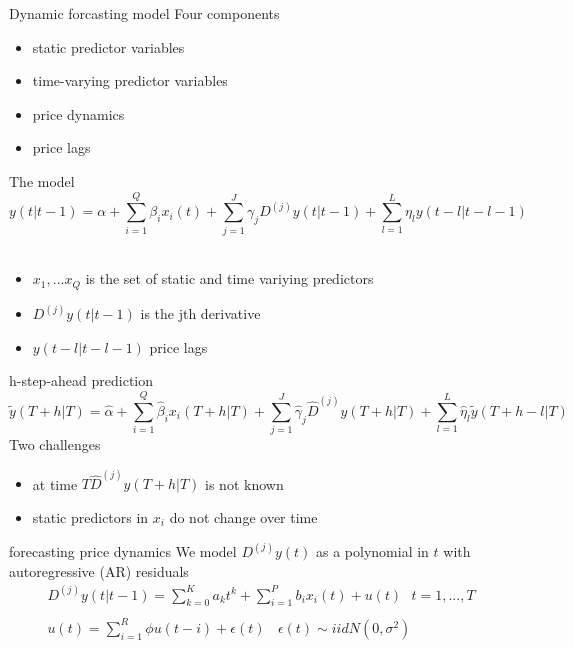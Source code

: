 \documentclass[hyperref={pdfpagelabels=false}]{beamer}
\begin{document}
\begin{frame}{Dynamic forcasting model}
Four components
\begin{itemize}
	\item static predictor variables
	\item time-varying predictor variables
	\item price dynamics
	\item price lags
\end{itemize}	
\end{frame}

\begin{frame}{The model}
\begin{equation}
y(t|t-1)=\alpha+\sum_{i=1}^{Q}\beta_ix_i(t)+\sum_{j=1}^J\gamma_jD^{(j)}y(t|t-1)+\sum_{l=1}^L\eta_ly(t-l|t-l-1) \nonumber
\end{equation}
\newline \\
\begin{itemize}
	\item $x_1,...x_Q$ is the set of static and time variying predictors
	\item $D^{(j)}y(t|t-1)$ is the jth derivative
	\item $y(t-l|t-l-1)$ price lags
\end{itemize}
\end{frame}

\begin{frame}{h-step-ahead prediction}
\small
\begin{equation}
\tilde{y}(T+h|T)=\hat{\alpha}+\sum_{i=1}^{Q}\hat{\beta}_ix_i(T+h|T)+\sum_{j=1}^J\hat{\gamma}_j\hat{D}^{(j)}y(T+h|T)+\sum_{l=1}^L\hat{\eta}_l\tilde{y}(T+h-l|T) \nonumber
\end{equation}
\normalsize
\newline
Two challenges
\begin{itemize}
	\item at time $T \hat{D}^{(j)}y(T+h|T)$ is not known
	\item static predictors in $x_i$ do not change over time
\end{itemize}
\end{frame}

\begin{frame}{forecasting price dynamics}
We model $D^{(j)}y(t)$ as a polynomial in $t$ with autoregressive (AR) residuals
\begin{align}
D^{(j)}y(t|t-1) =\sum_{k=0}^Ka_kt^k+\sum_{i=1}^Pb_ix_i(t)+u(t) \ \ \ t=1,...,T \nonumber \\ \\ u(t)=\sum_{i=1}^R\phi u(t-i)+\epsilon(t) \ \ \ \ \epsilon(t) \sim iidN(0,\sigma^2)
\end{align} 
\end{frame}
\end{document}
